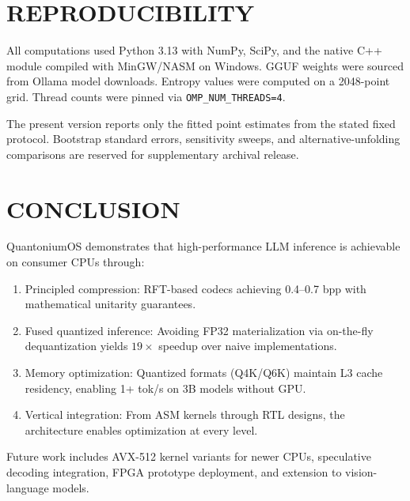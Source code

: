 \documentclass[aip,twocolumn,letterpaper]{revtex4}
\begin{document}
\section{REPRODUCIBILITY}

All computations used Python 3.13 with NumPy, SciPy, and the native C++ module compiled with MinGW/NASM on Windows. GGUF weights were sourced from Ollama model downloads. Entropy values were computed on a 2048-point grid. Thread counts were pinned via \texttt{OMP\_NUM\_THREADS=4}.

The present version reports only the fitted point estimates from the stated fixed protocol. Bootstrap standard errors, sensitivity sweeps, and alternative-unfolding comparisons are reserved for supplementary archival release.

\section{CONCLUSION}

QuantoniumOS demonstrates that high-performance LLM inference is achievable on consumer CPUs through:

\begin{enumerate}
\item Principled compression: RFT-based codecs achieving 0.4--0.7 bpp with mathematical unitarity guarantees.

\item Fused quantized inference: Avoiding FP32 materialization via on-the-fly dequantization yields \(19\times\) speedup over naive implementations.

\item Memory optimization: Quantized formats (Q4K/Q6K) maintain L3 cache residency, enabling 1+ tok/s on 3B models without GPU.

\item Vertical integration: From ASM kernels through RTL designs, the architecture enables optimization at every level.
\end{enumerate}

Future work includes AVX-512 kernel variants for newer CPUs, speculative decoding integration, FPGA prototype deployment, and extension to vision-language models.

\end{document}
